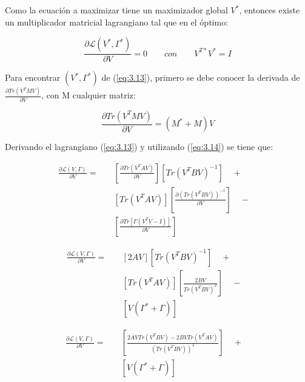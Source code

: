 Como la ecuación a maximizar tiene un maximizador global $V^*$, entonces existe un multiplicador matricial lagrangiano tal que en el óptimo:

\begin{equation}\label{eq:3.13}
\frac{\partial \mathcal{L}(V^*, \Gamma^*)}{\partial V} =  0 \qquad con \qquad V^{T*}V^* = I
\end{equation}

Para encontrar $(V^*, \Gamma^*)$ de (\ref{eq:3.13}), primero se debe conocer la derivada de $\frac{\partial Tr(V^T M V)}{\partial V}$, con M cualquier matriz:

\begin{equation}\label{eq:3.14}
\frac{\partial Tr(V^T M V)}{\partial V} = (M^* +M)V  
\end{equation}

\pagebreak
Derivando el lagrangiano (\ref{eq:3.13}) y utilizando (\ref{eq:3.14}) se tiene que:

\begin{equation*}
\begin{aligned}
\frac{\partial \mathcal{L}(V, \Gamma)}{\partial V} =&\quad  \left[\frac{\partial Tr(V^T A V) }{\partial V}\right]\left[Tr(V^T B V)^{-1}\right] \quad +& \\
&\quad \left[Tr(V^T A V)\right]\left[\frac{\partial (Tr(V^T B V))^{-1} }{\partial V}\right] \quad -& \\
&\quad \left[\frac{\partial Tr[\Gamma(V^TV-I)] }{\partial V}\right] \quad &
\end{aligned}
\end{equation*}
\vspace{5mm}

\begin{equation*}
\begin{aligned}
\frac{\partial \mathcal{L}(V, \Gamma)}{\partial V} =&\quad  \left[2AV\right]\left[Tr(V^T B V)^{-1}\right] \quad +& \\
&\quad \left[Tr(V^T A V)\right]\left[\frac{2BV}{Tr(V^T B V)^2}\right] \quad -& \\
&\quad \left[V (\Gamma^* + \Gamma) \right] \quad &
\end{aligned}
\end{equation*}
\vspace{5mm}

\begin{equation}\label{eq:3.15}
\begin{aligned}
\frac{\partial \mathcal{L}(V, \Gamma)}{\partial V} =&\quad  \left[\frac{2AV Tr(V^T B V)- 2BV Tr(V^T A V)}{(Tr(V^T B V))^2}\right] \quad +& \\
&\quad \left[V (\Gamma^* + \Gamma) \right] \quad &
\end{aligned}
\end{equation}

